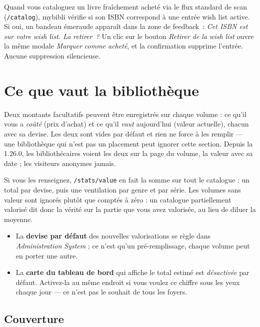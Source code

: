 Quand vous cataloguez un livre fraîchement acheté via le flux
standard de scan (\texttt{/catalog}), mybibli vérifie si son ISBN
correspond à une entrée wish list active. Si oui, un bandeau
émeraude apparaît dans la zone de feedback~: \emph{Cet ISBN est
sur votre wish list. La retirer~?} Un clic sur le bouton
\emph{Retirer de la wish list} ouvre la même modale \emph{Marquer
comme acheté}, et la confirmation supprime l'entrée. Aucune
suppression silencieuse.

\section{Ce que vaut la bibliothèque}\label{sec:valuation}

Deux montants facultatifs peuvent être enregistrés sur chaque volume :
ce qu'il vous a \emph{coûté} (prix d'achat) et ce qu'il \emph{vaut}
aujourd'hui (valeur actuelle), chacun avec sa devise. Les deux sont
vides par défaut et rien ne force à les remplir --- une bibliothèque qui
n'est pas un placement peut ignorer cette section. Depuis la 1.26.0, les bibliothécaires voient les deux sur la page du
volume, la valeur avec sa date ; les visiteurs anonymes jamais.

Si vous les renseignez, \texttt{/stats/value} en
fait la somme sur tout le catalogue : un total par devise, puis une
ventilation par genre et par série. Les volumes sans valeur sont
ignorés plutôt que comptés à zéro : un catalogue partiellement valorisé
dit donc la vérité sur la partie que vous avez valorisée, au lieu de
diluer la moyenne.

\begin{itemize}
  \item La \textbf{devise par défaut} des nouvelles valorisations se
        règle dans \emph{Administration \textrightarrow{} System} ; ce
        n'est qu'un pré-remplissage, chaque volume peut en porter une
        autre.
  \item La \textbf{carte du tableau de bord} qui affiche le total estimé
        est \emph{désactivée} par défaut. Activez-la au même endroit si
        vous voulez ce chiffre sous les yeux chaque jour --- ce n'est pas
        le souhait de tous les foyers.
\end{itemize}

\subsection*{Couverture}

